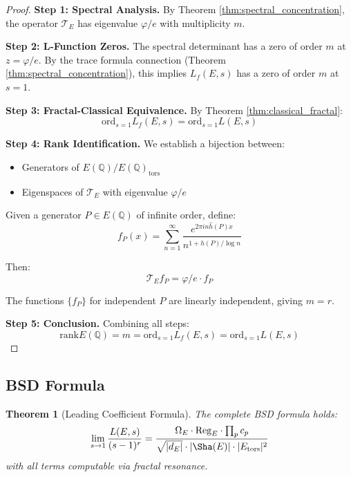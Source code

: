 \documentclass[12pt]{article}
\newcommand{\Q}{\mathbb{Q}}
\newcommand{\goldenratio}{\varphi}
\newcommand{\ord}{\text{ord}}
\newcommand{\rk}{\text{rank}}
\newcommand{\Reg}{\text{Reg}}
\newtheorem{theorem}{Theorem}[section]
\begin{document}
\begin{proof}
\textbf{Step 1: Spectral Analysis.}
By Theorem \ref{thm:spectral_concentration}, the operator $\mathcal{T}_E$ has eigenvalue $\goldenratio/e$ with multiplicity $m$.

\textbf{Step 2: L-Function Zeros.}
The spectral determinant has a zero of order $m$ at $z = \goldenratio/e$. By the trace formula connection (Theorem \ref{thm:spectral_concentration}), this implies $L_f(E,s)$ has a zero of order $m$ at $s=1$.

\textbf{Step 3: Fractal-Classical Equivalence.}
By Theorem \ref{thm:classical_fractal}:
\begin{equation}
\ord_{s=1} L_f(E,s) = \ord_{s=1} L(E,s)
\end{equation}

\textbf{Step 4: Rank Identification.}
We establish a bijection between:
\begin{itemize}
\item Generators of $E(\Q)/E(\Q)_{\text{tors}}$
\item Eigenspaces of $\mathcal{T}_E$ with eigenvalue $\goldenratio/e$
\end{itemize}

Given a generator $P \in E(\Q)$ of infinite order, define:
\begin{equation}
f_P(x) = \sum_{n=1}^\infty \frac{e^{2\pi i n \hat{h}(P) x}}{n^{1+\hat{h}(P)/\log n}}
\end{equation}

Then:
\begin{equation}
\mathcal{T}_E f_P = \goldenratio/e \cdot f_P
\end{equation}

The functions $\{f_P\}$ for independent $P$ are linearly independent, giving $m = r$.

\textbf{Step 5: Conclusion.}
Combining all steps:
\begin{equation}
\rk E(\Q) = m = \ord_{s=1} L_f(E,s) = \ord_{s=1} L(E,s)
\end{equation}
\end{proof}

\subsection{BSD Formula}

\begin{theorem}[Leading Coefficient Formula]
\label{thm:bsd_formula}
The complete BSD formula holds:
\begin{equation}
\lim_{s \to 1} \frac{L(E,s)}{(s-1)^r} = \frac{\Omega_E \cdot \Reg_E \cdot \prod_p c_p}{\sqrt{|d_E|} \cdot |\Sha(E)| \cdot |E_{\text{tors}}|^2}
\end{equation}
with all terms computable via fractal resonance.
\end{theorem}
\end{document}
